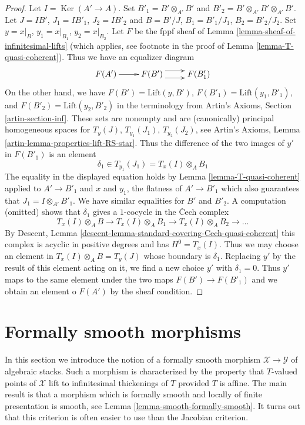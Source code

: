\documentclass{stacks-project}
\theoremstyle{plain}
\theoremstyle{definition}
\theoremstyle{remark}
\numberwithin{equation}{subsection}
\def\Ker{\mathop{\mathrm{Ker}}}
\begin{document}
\begin{proof}
Let $I = \Ker(A' \to A)$. Set $B'_1 = B' \otimes_{A'} B'$ and
$B'_2 = B' \otimes_{A'} B' \otimes_{A'} B'$. Let
$J = IB'$, $J_1 = IB'_1$, $J_2 = IB'_2$ and
$B = B'/J$, $B_1 = B'_1/J_1$, $B_2 = B'_2/J_2$.
Set $y = x|_B$, $y_1 = x|_{B_1}$, $y_2 = x|_{B_2}$.
Let $F$ be the fppf sheaf of
Lemma \ref{lemma-sheaf-of-infinitesimal-lifts}
(which applies, see footnote in the proof of
Lemma \ref{lemma-T-quasi-coherent}).
Thus we have an equalizer diagram
$$
\xymatrix{
F(A') \ar[r] &
F(B') \ar@<1ex>[r] \ar@<-1ex>[r] &
F(B'_1)
}
$$
On the other hand, we have $F(B') = \text{Lift}(y, B')$,
$F(B'_1) = \text{Lift}(y_1, B'_1)$, and $F(B'_2) = \text{Lift}(y_2, B'_2)$
in the terminology from Artin's Axioms, Section \ref{artin-section-inf}.
These sets are nonempty and are (canonically) principal homogeneous spaces for
$T_y(J)$, $T_{y_1}(J_1)$, $T_{y_2}(J_2)$, see
Artin's Axioms, Lemma \ref{artin-lemma-properties-lift-RS-star}.
Thus the difference of the two images of $y'$ in
$F(B'_1)$ is an element
$$
\delta_1 \in T_{y_1}(J_1) = T_x(I) \otimes_A B_1
$$
The equality in the displayed equation holds by
Lemma \ref{lemma-T-quasi-coherent} applied to
$A' \to B'_1$ and $x$ and $y_1$, the flatness of $A' \to B'_1$
which also guarantees that $J_1 = I \otimes_{A'} B'_1$. We have
similar equalities for $B'$ and $B'_2$.
A computation (omitted) shows that $\delta_1$ gives
a $1$-cocycle in the {\v C}ech complex
$$
T_x(I) \otimes_A B \to
T_x(I) \otimes_A B_1 \to
T_x(I) \otimes_A B_2 \to \ldots
$$
By Descent, Lemma \ref{descent-lemma-standard-covering-Cech-quasi-coherent}
this complex is acyclic in positive degrees and has $H^0 = T_x(I)$.
Thus we may choose an element in $T_x(I) \otimes_A B = T_y(J)$
whose boundary is $\delta_1$. Replacing $y'$ by the result
of this element acting on it, we find a new choice $y'$ with $\delta_1 = 0$.
Thus $y'$ maps to the same element under the two maps
$F(B') \to F(B'_1)$ and we obtain an element o $F(A')$ by
the sheaf condition.
\end{proof}












\section{Formally smooth morphisms}
\label{section-formally-smooth}

\noindent
In this section we introduce the notion of a formally smooth morphism
$\mathcal{X} \to \mathcal{Y}$ of algebraic stacks. Such a morphism is
characterized by the property that $T$-valued points of $\mathcal{X}$ lift
to infinitesimal thickenings of $T$ provided $T$ is affine.
The main result is that a morphism which is formally smooth and
locally of finite presentation is smooth, see
Lemma \ref{lemma-smooth-formally-smooth}.
It turns out that this criterion is often easier to use than the
Jacobian criterion.
\end{document}
